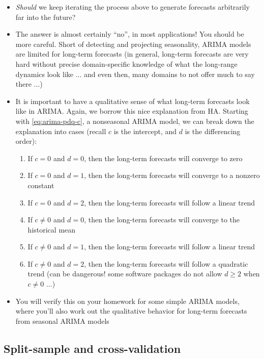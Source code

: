 \documentclass{article}
\begin{document}
\begin{itemize}
\item \emph{Should} we keep iterating the process above to generate forecasts
  arbitrarily far into the future? 

\item The answer is almost certainly ``no'', in most applications! You should 
  be more careful. Short of detecting and projecting seasonality, ARIMA models
  are limited for long-term forecasts (in general, long-term forecasts are very
  hard without precise domain-specific knowledge of what the long-range dynamics
  look like ... and even then, many domains to not offer much to say there ...)  

\item It is important to have a qualitative sense of what long-term forecasts
  look like in ARIMA. Again, we borrow this nice explanation from HA. Starting
  with \eqref{eq:arima-pdq-c}, a nonseasonal ARIMA model, we can break down the
  explanation into cases (recall $c$ is the intercept, and $d$ is the
  differencing order):  

\begin{enumerate}
\item If $c = 0$ and $d = 0$, then the long-term forecasts will converge
  to zero 
\item If $c = 0$ and $d = 1$, then the long-term forecasts will converge
  to a nonzero constant 
\item If $c = 0$ and $d = 2$, then the long-term forecasts will follow a
  linear trend
\item  If $c \not= 0$ and $d = 0$, then the long-term forecasts will
  converge to the historical mean 
\item  If $c \not= 0$ and $d = 1$, then the long-term forecasts will
  follow a linear trend
\item  If $c \not= 0$ and $d = 2$, then the long-term forecasts will
  follow a quadratic trend (can be dangerous! some software packages do not
  allow $d \geq 2$ when $c \not= 0$ ...)
\end{enumerate}

\item You will verify this on your homework for some simple ARIMA models, where
  you'll also work out the qualitative behavior for long-term forecasts from
  seasonal ARIMA models 
\end{itemize}

\subsection{Split-sample and cross-validation}
\end{document}
